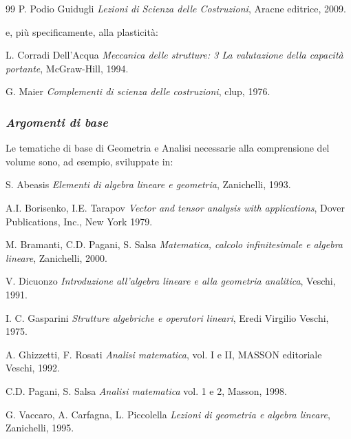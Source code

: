 \begin{thebibliography}{99}
P. Podio Guidugli {\em Lezioni di Scienza delle Costruzioni}, Aracne editrice, 2009.



\vspace{0.5 cm} e, pi\`{u} specificamente, alla  plasticit\`{a}:




L. Corradi Dell'Acqua {\em Meccanica delle strutture: 3 La
valutazione della capacit\`{a} portante}, McGraw-Hill, 1994.

G. Maier {\em Complementi di scienza delle costruzioni}, clup,
1976.


\vspace{0.6 cm}
\subsubsection{\emph{Argomenti di base}}

 \noindent Le tematiche  di base di Geometria e Analisi
 necessarie alla comprensione del volume sono, ad esempio, sviluppate in:


S. Abeasis {\em Elementi di algebra lineare e geometria}, Zanichelli,  1993.


A.I. Borisenko, I.E. Tarapov {\em Vector and tensor analysis with
applications}, Dover Publications, Inc., New York 1979.



M. Bramanti, C.D. Pagani, S. Salsa \emph{Matematica, calcolo
infinitesimale e algebra lineare}, Zanichelli, 2000.


V. Dicuonzo {\em Introduzione all'algebra lineare e alla geometria analitica}, Veschi,  1991.



I. C. Gasparini {\em Strutture algebriche e operatori lineari}, Eredi Virgilio Veschi,  1975.



A. Ghizzetti, F. Rosati {\em Analisi matematica}, vol. I e II,
MASSON editoriale Veschi, 1992.


C.D. Pagani, S. Salsa \emph{Analisi matematica} vol. 1 e 2, Masson, 1998.

G. Vaccaro, A. Carfagna, L. Piccolella  {\em Lezioni di geometria e  algebra lineare}, Zanichelli,  1995.


\end{thebibliography}
